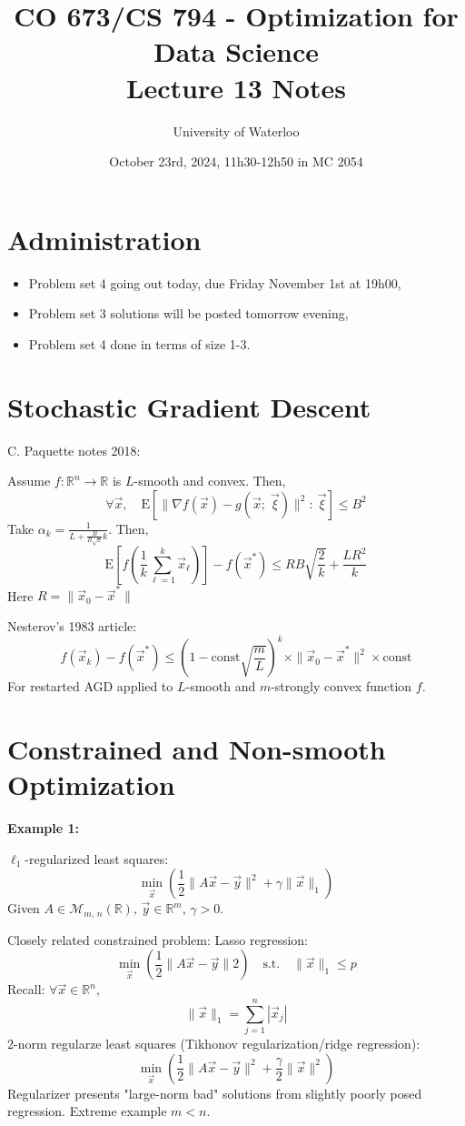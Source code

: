 \documentclass{article}
\title{CO 673/CS 794 - Optimization for Data Science\\Lecture 13 Notes}
\author{University of Waterloo}
\date{October 23rd, 2024, 11h30-12h50 in MC 2054}
\newcommand{\R}{\mathbb{R}}
\newcommand{\E}{\text{E}}
\newcommand{\ds}{\displaystyle}
\begin{document}
\maketitle

\section{Administration}

\begin{itemize}
    \item Problem set 4 going out today, due Friday November 1st at 19h00,
    \item Problem set 3 solutions will be posted tomorrow evening,
    \item Problem set 4 done in terms of size 1-3.
\end{itemize}

\section{Stochastic Gradient Descent}

C. Paquette notes 2018:

Assume $f \colon \R^n \to \R$ is $L$-smooth and convex. Then,
\[
    \forall \vec{x}, \quad \E\left[\|\nabla f(\vec{x}) - g(\vec{x};\; \vec{\xi})\|^2:\: \vec{\xi}\right] \leq B^2
\]
Take $\ds \alpha_k = \frac{1}{L + \frac{B}{R\sqrt{z}}k}$. Then,
\[
    \E\left[f\left(\frac{1}{k}\sum_{\ell = 1}^k \vec{x}_\ell\right)\right] - f(\vec{x}^*) \leq RB\sqrt{\frac{2}{k}} + \frac{LR^2}{k}
\]
Here $R = \|\vec{x}_0 - \vec{x}^*\|$

Nesterov's 1983 article:
\[
    f(\vec{x}_k) - f(\vec{x}^*) \leq \left(1 - \text{const}\sqrt{\frac{m}{L}}\right)^k \times \|\vec{x}_0 - \vec{x}^*\|^2 \times \text{const}
\]
For restarted AGD applied to $L$-smooth and $m$-strongly convex function $f$.


\section{Constrained and Non-smooth Optimization}

\textbf{Example 1:}

$\ell_1$-regularized least squares:
\[
    \min_{\vec{x}}\left(\frac{1}{2}\|A\vec{x} - \vec{y}\|^2 + \gamma\|\vec{x}\|_1\right) \tag{$\ell_1$ LS}
\]
Given $A \in \mathcal{M}_{m,\, n}(\R),\, \vec{y} \in \R^m,\, \gamma > 0$.

Closely related constrained problem: Lasso regression:
\[
    \min_{\vec{x}}\left(\frac{1}{2}\|A\vec{x} - \vec{y}\|2\right) \quad \text{s.t.} \quad \|\vec{x}\|_1 \leq p
\]
Recall: $\forall \vec{x} \in \R^n$,
\[
\|\vec{x}\|_1 = \sum_{j = 1}^{n} |\vec{x}_j|
\]
2-norm regularze least squares (Tikhonov regularization/ridge regression):
\[
    \min_{\vec{x}}\left(\frac{1}{2}\|A\vec{x} - \vec{y}\|^2 + \frac{\gamma}{2}\|\vec{x}\|^2\right)
\]
Regularizer presents "large-norm bad" solutions from slightly poorly posed regression. Extreme example $m < n$.
\end{document}
